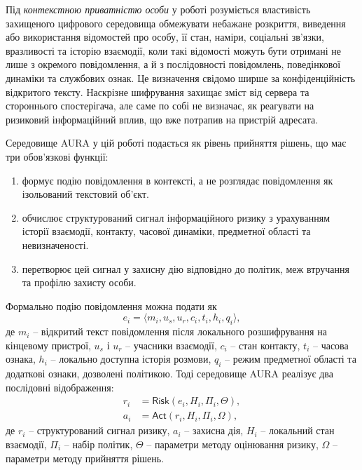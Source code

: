 Під \emph{контекстною приватністю особи} у роботі розуміється властивість захищеного цифрового середовища обмежувати небажане розкриття, виведення або використання відомостей про особу, її стан, наміри, соціальні зв'язки, вразливості та історію взаємодії, коли такі відомості можуть бути отримані не лише з окремого повідомлення, а й з послідовності повідомлень, поведінкової динаміки та службових ознак. Це визначення свідомо ширше за конфіденційність відкритого тексту. Наскрізне шифрування захищає зміст від сервера та стороннього спостерігача, але саме по собі не визначає, як реагувати на ризиковий інформаційний вплив, що вже потрапив на пристрій адресата.

Середовище AURA у цій роботі подається як рівень прийняття рішень, що має три обов'язкові функції:

\begin{enumerate}
  \item формує подію повідомлення в контексті, а не розглядає повідомлення як ізольований текстовий об'єкт.
  \item обчислює структурований сигнал інформаційного ризику з урахуванням історії взаємодії, контакту, часової динаміки, предметної області та невизначеності.
  \item перетворює цей сигнал у захисну дію відповідно до політик, меж втручання та профілю захисту особи.
\end{enumerate}

Формально подію повідомлення можна подати як
\begin{equation}
  e_i = \langle m_i, u_s, u_r, c_i, t_i, h_i, q_i \rangle,
  \label{eq:aura-event}
\end{equation}
де \(m_i\) -- відкритий текст повідомлення після локального розшифрування на кінцевому пристрої, \(u_s\) і \(u_r\) -- учасники взаємодії, \(c_i\) -- стан контакту, \(t_i\) -- часова ознака, \(h_i\) -- локально доступна історія розмови, \(q_i\) -- режим предметної області та додаткові ознаки, дозволені політикою. Тоді середовище AURA реалізує два послідовні відображення:
\begin{align}
  r_i &= \mathsf{Risk}(e_i, H_i, \Pi_i, \Theta), \label{eq:aura-risk}\\
  a_i &= \mathsf{Act}(r_i, H_i, \Pi_i, \Omega), \label{eq:aura-action}
\end{align}
де \(r_i\) -- структурований сигнал ризику, \(a_i\) -- захисна дія, \(H_i\) -- локальний стан взаємодії, \(\Pi_i\) -- набір політик, \(\Theta\) -- параметри методу оцінювання ризику, \(\Omega\) -- параметри методу прийняття рішень.

